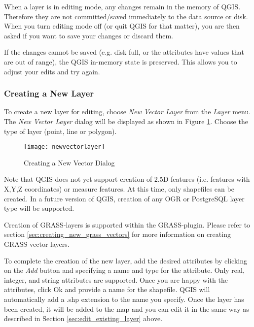 
When a layer is in editing mode, any changes remain in the memory of QGIS.
Therefore they are not committed/saved immediately to the data source or disk.
When you turn editing mode off (or quit QGIS for that matter), 
you are then asked if you want to save your
changes or discard them.

If the changes cannot be saved (e.g. disk full, or the attributes have
values that are out of range), the QGIS in-memory state is preserved.  This
allows you to adjust your edits and try again.

\subsubsection{Creating a New Layer}\label{sec:create shape}

To create a new layer for editing, choose \textit{New Vector Layer} from the
\textit{Layer} menu. The \textit{New Vector Layer} dialog will be displayed as
shown in Figure \ref{fig:newvectorlayer}. Choose the type of layer (point,
line or polygon).

\begin{figure}[ht]
   \begin{center}
   \caption{Creating a New Vector Dialog}\label{fig:newvectorlayer}\smallskip
   \texttt{[image: newvectorlayer]}
\end{center} 
\end{figure}

Note that QGIS does not yet support creation of 2.5D
features (i.e. features with X,Y,Z coordinates) or measure features. At this
time, only shapefiles can be created. In a future version of QGIS, creation of
any OGR or PostgreSQL layer type will be supported. 

Creation of GRASS-layers is supported within the GRASS-plugin. Please refer to section
\ref{sec:creating_new_grass_vectors} for more information on creating GRASS vector 
layers.

To complete the creation of the new layer, add the desired attributes by
clicking on the \textit{Add} button and specifying a name and type for the
attribute. Only real, integer, and string attributes are supported. Once you
are happy with the attributes, click Ok and provide a name for the shapefile.
QGIS will automatically add a .shp extension to the name you specify.  Once
the layer has been created, it will be added to the map and you can edit it in
the same way as described in Section \ref{sec:edit_existing_layer} above. 

